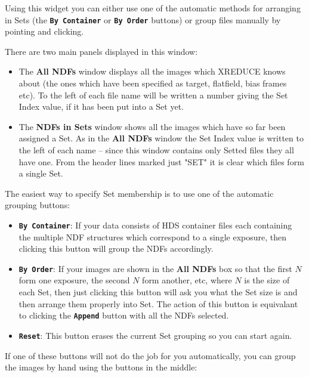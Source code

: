\documentclass[11pt]{article}
\newcommand{\butt}[1]{{\bf \tt #1}}
\newcommand{\wlab}[1]{{\bf #1}}
\begin{document}
Using this widget you can either use one of the automatic methods
for arranging in Sets (the \butt{By Container} or \butt{By Order} buttons)
or group files manually by pointing and clicking.

There are two main panels displayed in this window:
\begin{itemize}
\item
The \wlab{All NDFs} window displays all the images which XREDUCE 
knows about (the ones which have been specified as target, flatfield,
bias frames etc).  To the left of each file name will be written 
a number giving the Set Index value, if it has been put into a Set yet.
\item
The \wlab{NDFs in Sets} window shows all the images which have so far
been assigned a Set.  As in the \wlab{All NDFs} window the Set Index
value is written to the left of each name -- since this window contains
only Setted files they all have one. 
From the header lines marked just "SET" it is clear which files 
form a single Set.
\end{itemize}

The easiest way to specify Set membership is to use one of the
automatic grouping buttons:
\begin{itemize}
\item \butt{By Container}:
If your data consists of HDS container files each containing the
multiple NDF structures which correspond to a single exposure,
then clicking this button will group the NDFs accordingly.
\item \butt{By Order}:
If your images are shown in the \wlab{All NDFs} box  so that
the first $N$ form one exposure, the second $N$ form another,
etc, where $N$ is the size of each Set, then just clicking this
button will ask you what the Set size is and then arrange them 
properly into Set. 
The action of this button is equivalant to clicking the
\butt{Append} button with all the NDFs selected.
\item \butt{Reset}:
This button erases the current Set grouping so you can start again.
\end{itemize}

If one of these buttons will not do the job for you automatically,
you can group the images by hand using the buttons in the middle:
\end{document}
